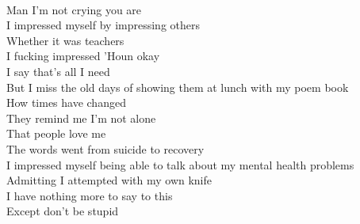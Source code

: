 \documentclass[12pt, b5paper, oneside]{book}
\begin{document}
\\Man I'm not crying you are
\\I impressed myself by impressing others
\\Whether it was teachers
\\I fucking impressed 'Houn okay
\\I say that's all I need
\\But I miss the old days of showing them at lunch with my poem book
\\How times have changed
\\They remind me I'm not alone
\\That people love me
\\The words went from suicide to recovery
\\I impressed myself being able to talk about my mental health problems
\\Admitting I attempted with my own knife
\\I have nothing more to say to this
\\Except don't be stupid

\newpage
\end{document}
